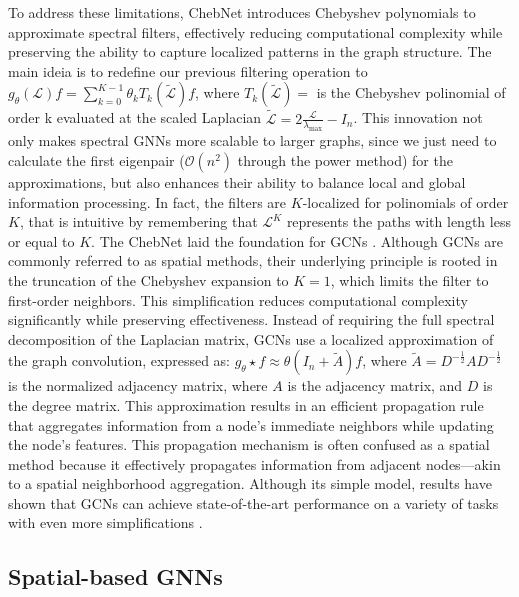 To address these limitations, ChebNet introduces Chebyshev polynomials to approximate spectral filters, effectively reducing computational complexity while preserving the ability to capture localized patterns in the graph structure. The main ideia is to redefine our previous filtering operation to $ g_{\theta}(\mathcal{L} ) f = \sum_{k=0}^{K-1} \theta_k T_k(\widetilde{\mathcal{L}}) f $, where $T_k(\widetilde{\mathcal{L}}) = $ is the Chebyshev polinomial of order k evaluated at the scaled Laplacian $\widetilde{\mathcal{L}} = 2 \frac{\mathcal{L}}{\lambda_\text{max}} - I_n$. This innovation not only makes spectral GNNs more scalable to larger graphs, since we just need to calculate the first eigenpair ($\mathcal{O}(n^2)$ through the power method) for the approximations, but also enhances their ability to balance local and global information processing. In fact, the filters are $K$-localized for polinomials of order $K$, that is intuitive by remembering that $\mathcal{L} ^K$ represents the paths with length less or equal to $K$.  
The ChebNet laid the foundation for GCNs \cite{kipf2016semi}. Although GCNs are commonly referred to as spatial methods, their underlying principle is rooted in the truncation of the Chebyshev expansion to $K=1$, which limits the filter to first-order neighbors. This simplification reduces computational complexity significantly while preserving effectiveness. Instead of requiring the full spectral decomposition of the Laplacian matrix, GCNs use a localized approximation of the graph convolution, expressed as: $g_{\theta} \star f \approx \theta (I_n + \widetilde{A}) f$, where $\widetilde{A} = D^{-\frac{1}{2}} A D^{-\frac{1}{2}}$ is the normalized adjacency matrix, where $A$ is the adjacency matrix, and $D$ is the degree matrix. This approximation results in an efficient propagation rule that aggregates information from a node's immediate neighbors while updating the node's features. This propagation mechanism is often confused as a spatial method because it effectively propagates information from adjacent nodes—akin to a spatial neighborhood aggregation. Although its simple model, results have shown that GCNs can achieve state-of-the-art performance on a variety of tasks with even more simplifications \cite{wu2019simplifying}.


\subsection{Spatial-based GNNs}


